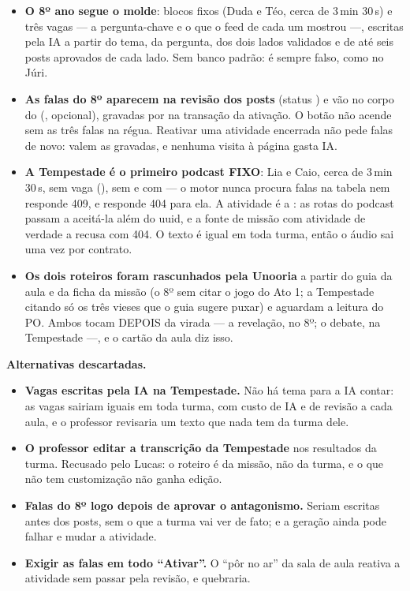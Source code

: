 \begin{itemize}
  \item \textbf{O 8º ano segue o molde}: blocos fixos (Duda e Téo, cerca de
    3\,min 30\,s) e três vagas --- a pergunta-chave e o que o feed de cada um
    mostrou ---, escritas pela IA a partir do tema, da pergunta, dos dois lados
    validados e de até seis posts aprovados de cada lado. Sem banco padrão:
     é sempre falso, como no Júri.
  \item \textbf{As falas do 8º aparecem na revisão dos posts} (status
    ) e vão no corpo do 
    (, opcional), gravadas por  na
    transação da ativação. O botão não acende sem as três falas na régua.
    Reativar uma atividade encerrada não pede falas de novo: valem as gravadas,
    e nenhuma visita à página gasta IA.
  \item \textbf{A Tempestade é o primeiro podcast FIXO}: Lia e Caio, cerca de
    3\,min 30\,s, sem vaga (), sem  e com
     --- o motor nunca procura falas na tabela nem responde
    409, e  responde 404 para ela. A atividade é a
    : as rotas do podcast passam a aceitá-la além do uuid, e a
    fonte de missão com atividade de verdade a recusa com 404. O texto é igual
    em toda turma, então o áudio sai uma vez por contrato.
  \item \textbf{Os dois roteiros foram rascunhados pela Unooria} a partir do
    guia da aula e da ficha da missão (o 8º sem citar o jogo do Ato 1; a
    Tempestade citando só os três vieses que o guia sugere puxar) e aguardam a
    leitura do PO. Ambos tocam DEPOIS da virada --- a revelação, no 8º; o
    debate, na Tempestade ---, e o cartão da aula diz isso.
\end{itemize}

\textbf{Alternativas descartadas.}

\begin{itemize}
  \item \textbf{Vagas escritas pela IA na Tempestade.} Não há tema para a IA
    contar: as vagas sairiam iguais em toda turma, com custo de IA e de revisão
    a cada aula, e o professor revisaria um texto que nada tem da turma dele.
  \item \textbf{O professor editar a transcrição da Tempestade} nos
    resultados da turma. Recusado pelo Lucas: o roteiro é da missão, não da
    turma, e o que não tem customização não ganha edição.
  \item \textbf{Falas do 8º logo depois de aprovar o antagonismo.} Seriam
    escritas antes dos posts, sem o que a turma vai ver de fato; e a geração
    ainda pode falhar e mudar a atividade.
  \item \textbf{Exigir as falas em todo \enquote{Ativar}.} O \enquote{pôr no
    ar} da sala de aula reativa a atividade sem passar pela revisão, e
    quebraria.
\end{itemize}

